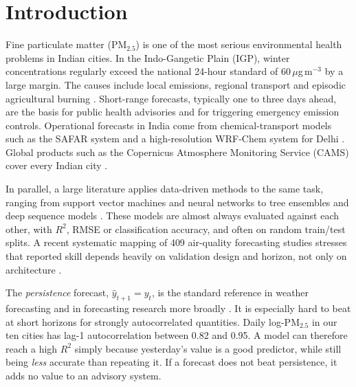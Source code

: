 \documentclass[conference]{IEEEtran}
\begin{document}
\section{Introduction}
Fine particulate matter (PM$_{2.5}$) is one of the most serious environmental health
problems in Indian cities. In the Indo-Gangetic Plain (IGP), winter concentrations regularly
exceed the national 24-hour standard of 60\,$\mu$g\,m$^{-3}$ by a large margin. The causes
include local emissions, regional transport and episodic agricultural burning
\cite{cusworth2018}. Short-range forecasts, typically one to three days ahead, are the basis for
public health advisories and for triggering emergency emission controls.
Operational forecasts in India come from chemical-transport models such as the
SAFAR system and a high-resolution WRF-Chem system for Delhi \cite{jena2021}.
Global products such as the Copernicus Atmosphere Monitoring Service (CAMS) cover
every Indian city \cite{inness2019}.

In parallel, a large literature applies data-driven methods to the same task,
ranging from support vector machines and neural networks
\cite{masood2020} to tree ensembles \cite{natarajan2024,maltare2023} and deep
sequence models \cite{pruthi2022,huang2018,zhou2024}. These models are almost always
evaluated against each other, with $R^2$, RMSE or classification accuracy, and often on
random train/test splits. A recent systematic mapping of 409 air-quality forecasting
studies stresses that reported skill depends heavily on validation design and
horizon, not only on architecture \cite{chianese2026}.

The \emph{persistence} forecast, $\hat y_{t+1}=y_t$, is the standard reference in
weather forecasting \cite{murphy1988,rasp2020} and in forecasting research more
broadly \cite{hyndman2006}. It is especially hard to beat at short horizons for
strongly autocorrelated quantities. Daily log-PM$_{2.5}$ in our ten cities has
lag-1 autocorrelation between 0.82 and 0.95. A model can therefore reach a high $R^2$ simply
because yesterday's value is a good predictor, while still being \emph{less} accurate
than repeating it. If a forecast does not beat persistence, it adds no value to an advisory system.
\end{document}
